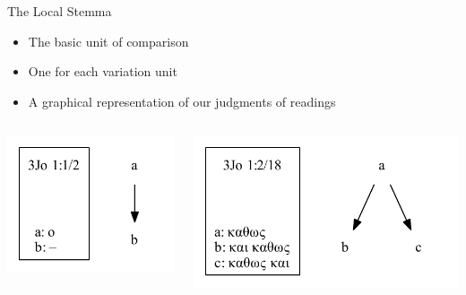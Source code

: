 \documentclass[10pt]{beamer}
\begin{document}
	\begin{frame}{The Local Stemma}\label{slide:local-stemma}
		\begin{itemize}
			\item The basic unit of comparison
			\item One for each variation unit
			\item A graphical representation of our judgments of readings
		\end{itemize}
		\begin{columns}
			\begin{column}{0.45\textwidth}
				\begin{center}
					\includegraphics[scale=0.5]{../graphics/B25K1V1U2-local-stemma.pdf}
				\end{center}
			\end{column}
			\begin{column}{0.45\textwidth}
				\begin{center}
					\includegraphics[scale=0.5]{../graphics/B25K1V2U18-local-stemma.pdf}
				\end{center}
			\end{column}
		\end{columns}
	\end{frame}
\end{document}
